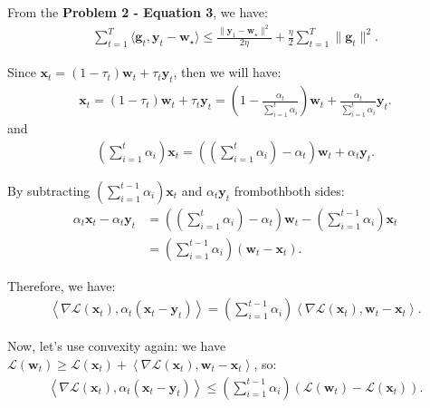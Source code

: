\documentclass[letterpaper]{article}
\newcommand{\bx}{\mathbf{x}}
\newcommand{\by}{\mathbf{y}}
\newcommand{\bw}{\mathbf{w}}
\newcommand{\bg}{\mathbf{g}}
\begin{document}
\begin{enumerate}
From the \textbf{Problem 2 - Equation 3}, we have:
\begin{equation}
	\begin{aligned}
		\sum_{t=1}^T \langle \bg_t, \by_t -\bw_\star\rangle \le \frac{\| \by_1 - \bw_\star \|^2}{2\eta} + \frac{\eta}{2} \sum_{t=1}^T \| \bg_t \|^2.
	\end{aligned}
\end{equation}

Since $\bx_t = (1-\tau_t)\bw_t + \tau_t \by_t$, then we will have:
\begin{equation}
	\begin{aligned}
		\mathbf{x}_t=\left(1-\tau_t\right) \mathbf{w}_t+\tau_t \mathbf{y}_t=\left(1-\frac{\alpha_t}{\sum_{i=1}^t \alpha_i}\right) \mathbf{w}_t+\frac{\alpha_t}{\sum_{i=1}^t \alpha_i} \mathbf{y}_t.
	\end{aligned}
\end{equation}
and 
\begin{equation}
	\begin{aligned}
		\left(\sum_{i=1}^t \alpha_i\right) \mathbf{x}_t=\left(\left(\sum_{i=1}^t \alpha_i\right)-\alpha_t\right) \mathbf{w}_t+\alpha_t \mathbf{y}_t.
	\end{aligned}
\end{equation}

By subtracting $\left(\sum_{i=1}^{t-1} \alpha_i\right) \mathbf{x}_t$ and $\alpha_t \by_t$ frombothboth sides:
\begin{equation}
	\begin{aligned}
		\alpha_t \mathbf{x}_t-\alpha_t \mathbf{y}_t & =\left(\left(\sum_{i=1}^t \alpha_i\right)-\alpha_t\right) \mathbf{w}_t-\left(\sum_{i=1}^{t-1} \alpha_i\right) \mathbf{x}_t \\
		& =\left(\sum_{i=1}^{t-1} \alpha_i\right)\left(\mathbf{w}_t-\mathbf{x}_t\right).
	\end{aligned}
\end{equation}

Therefore, we have:
\begin{equation}
	\begin{aligned}
		\left\langle\nabla \mathcal{L}\left(\mathbf{x}_t\right), \alpha_t\left(\mathbf{x}_t-\mathbf{y}_t\right)\right\rangle=\left(\sum_{i=1}^{t-1} \alpha_i\right)\left\langle\nabla \mathcal{L}\left(\mathbf{x}_t\right), \mathbf{w}_t-\mathbf{x}_t\right\rangle.
	\end{aligned}
\end{equation}

Now, let’s use convexity again: we have $\mathcal{L}\left(\mathbf{w}_t\right) \geq \mathcal{L}\left(\mathbf{x}_t\right)+\left\langle\nabla \mathcal{L}\left(\mathbf{x}_t\right), \mathbf{w}_t-\mathbf{x}_t\right\rangle$, so:
\begin{equation}
	\begin{aligned}
		\left\langle\nabla \mathcal{L}\left(\mathbf{x}_t\right), \alpha_t\left(\mathbf{x}_t-\mathbf{y}_t\right)\right\rangle \leq\left(\sum_{i=1}^{t-1} \alpha_i\right)\left(\mathcal{L}\left(\mathbf{w}_t\right)-\mathcal{L}\left(\mathbf{x}_t\right)\right).
	\end{aligned}
\end{equation}


\end{enumerate}
\end{document}
